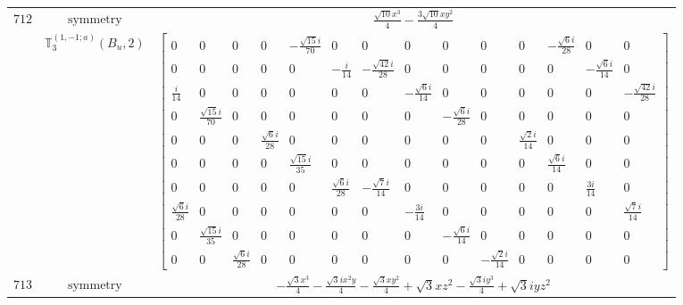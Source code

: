 \documentclass[fleqn,8pt,landscape]{jsarticle}
\begin{document}
\begin{longtable}{ccc}
$ 712 $ & $ \text{symmetry} $ & $ \frac{\sqrt{10} x^{3}}{4} - \frac{3 \sqrt{10} x y^{2}}{4} $ \\
$  $ & $ \mathbb{T}_{3}^{(1,-1;a)}(B_{u},2) $ & $ \begin{bmatrix} 0 & 0 & 0 & 0 & - \frac{\sqrt{15} i}{70} & 0 & 0 & 0 & 0 & 0 & 0 & - \frac{\sqrt{6} i}{28} & 0 & 0 \\ 0 & 0 & 0 & 0 & 0 & - \frac{i}{14} & - \frac{\sqrt{42} i}{28} & 0 & 0 & 0 & 0 & 0 & - \frac{\sqrt{6} i}{14} & 0 \\ \frac{i}{14} & 0 & 0 & 0 & 0 & 0 & 0 & - \frac{\sqrt{6} i}{14} & 0 & 0 & 0 & 0 & 0 & - \frac{\sqrt{42} i}{28} \\ 0 & \frac{\sqrt{15} i}{70} & 0 & 0 & 0 & 0 & 0 & 0 & - \frac{\sqrt{6} i}{28} & 0 & 0 & 0 & 0 & 0 \\ 0 & 0 & 0 & \frac{\sqrt{6} i}{28} & 0 & 0 & 0 & 0 & 0 & 0 & \frac{\sqrt{2} i}{14} & 0 & 0 & 0 \\ 0 & 0 & 0 & 0 & \frac{\sqrt{15} i}{35} & 0 & 0 & 0 & 0 & 0 & 0 & \frac{\sqrt{6} i}{14} & 0 & 0 \\ 0 & 0 & 0 & 0 & 0 & \frac{\sqrt{6} i}{28} & - \frac{\sqrt{7} i}{14} & 0 & 0 & 0 & 0 & 0 & \frac{3 i}{14} & 0 \\ \frac{\sqrt{6} i}{28} & 0 & 0 & 0 & 0 & 0 & 0 & - \frac{3 i}{14} & 0 & 0 & 0 & 0 & 0 & \frac{\sqrt{7} i}{14} \\ 0 & \frac{\sqrt{15} i}{35} & 0 & 0 & 0 & 0 & 0 & 0 & - \frac{\sqrt{6} i}{14} & 0 & 0 & 0 & 0 & 0 \\ 0 & 0 & \frac{\sqrt{6} i}{28} & 0 & 0 & 0 & 0 & 0 & 0 & - \frac{\sqrt{2} i}{14} & 0 & 0 & 0 & 0 \end{bmatrix} $ \\ \hline
$ 713 $ & $ \text{symmetry} $ & $ - \frac{\sqrt{3} x^{3}}{4} - \frac{\sqrt{3} i x^{2} y}{4} - \frac{\sqrt{3} x y^{2}}{4} + \sqrt{3} x z^{2} - \frac{\sqrt{3} i y^{3}}{4} + \sqrt{3} i y z^{2} $ \\

\end{longtable}
\end{document}
